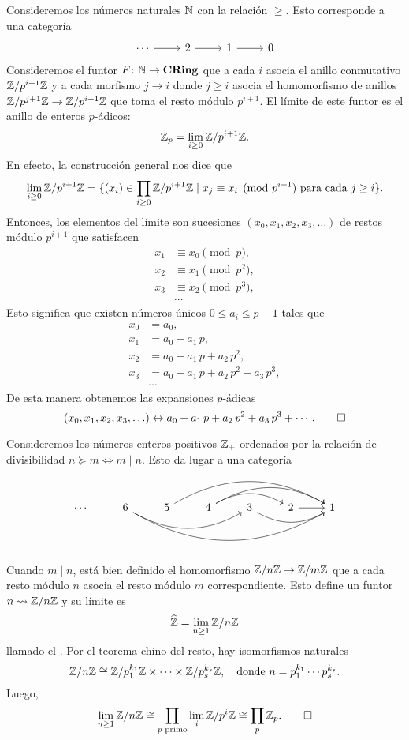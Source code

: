 \documentclass{article}
\numberwithin{equation}{section}
\theoremstyle{definition}
\begin{document}
\begin{ejemplo}
  Consideremos los números naturales $\mathbb{N}$ con la relación $\ge$. Esto
  corresponde a una categoría
  $$\begin{tikzcd}
    \cdots\ar{r} & 2\ar{r} & 1\ar{r} & 0
  \end{tikzcd}$$
  Consideremos el funtor $F\colon \mathbb{N}\to \text{\bf CRing}$ que a cada $i$ asocia el
  anillo conmutativo $\mathbb{Z}/p^{i+1}\mathbb{Z}$ y a cada morfismo $j\to i$ donde $j \ge i$
  asocia el homomorfismo de anillos $\mathbb{Z}/p^{j+1}\mathbb{Z} \to \mathbb{Z}/p^{i+1}\mathbb{Z}$ que toma
  el resto módulo $p^{i+1}$. El límite de este funtor es el anillo de enteros
  $p$-ádicos:
  $$\mathbb{Z}_p = \lim_{i\ge 0} \mathbb{Z}/p^{i+1}\mathbb{Z}.$$
  En efecto, la construcción general nos dice que
  \[ \lim_{i\ge 0} \mathbb{Z}/p^{i+1}\mathbb{Z} =
     \{ (x_i) \in \prod_{i\ge 0} \mathbb{Z}/p^{i+1}\mathbb{Z} \mid
            x_j \equiv x_i \pmod{p^{i+1}} \text{ para cada }j\ge i \}. \]
  Entonces, los elementos del límite son sucesiones
  $(x_0,x_1,x_2,x_3,\ldots)$ de restos módulo $p^{i+1}$ que satisfacen
  \begin{align*}
    x_1 & \equiv x_0 \pmod{p},\\
    x_2 & \equiv x_1 \pmod{p^2},\\
    x_3 & \equiv x_2 \pmod{p^3},\\
        & \cdots
  \end{align*}
  Esto significa que existen números únicos $0\le a_i\le p-1$ tales que
  \begin{align*}
    x_0 & = a_0,\\
    x_1 & = a_0 + a_1\,p,\\
    x_2 & = a_0 + a_1\,p + a_2\,p^2,\\
    x_3 & = a_0 + a_1\,p + a_2\,p^2 + a_3\,p^3,\\
        & \cdots
  \end{align*}
  De esta manera obtenemos las expansiones $p$-ádicas
  \[ (x_0,x_1,x_2,x_3,\ldots) \leftrightarrow
     a_0 + a_1\,p + a_2\,p^2 + a_3\,p^3 + \cdots. \qedhere \]
\end{ejemplo}

\begin{ejemplo}
  Consideremos los números enteros positivos $\mathbb{Z}_+$ ordenados por la relación
  de divisibilidad $n \succeq m \iff m \mid n$. Esto da lugar a una categoría
  \[ \begin{tikzcd}\cdots & 6\ar[bend right]{rrr}\ar[bend right]{rrrrr} & 5\ar[bend left]{rrrr} & 4\ar[bend left]{rr}\ar[bend left]{rrr} & 3\ar[bend right]{rr} & 2\ar{r} & 1 \end{tikzcd} \]

  Cuando $m\mid n$, está bien definido el homomorfismo $\mathbb{Z}/n\mathbb{Z}\to \mathbb{Z}/m\mathbb{Z}$
  que a cada resto módulo $n$ asocia el resto módulo $m$ correspondiente. Esto
  define un funtor $n \rightsquigarrow \mathbb{Z}/n\mathbb{Z}$ y su límite es
  $$\widehat{\mathbb{Z}} = \lim_{n\ge 1} \mathbb{Z}/n\mathbb{Z}$$
  llamado el . Por el teorema chino del resto, hay isomorfismos naturales
  \[ \mathbb{Z}/n\mathbb{Z} \cong \mathbb{Z}/p_1^{k_1}\mathbb{Z}\times\cdots\times  \mathbb{Z}/p_s^{k_s}\mathbb{Z}, \quad
     \text{donde }n = p_1^{k_1}\cdots p_s^{k_s}. \]
  Luego,
  \[ \lim_{n\ge 1} \mathbb{Z}/n\mathbb{Z} \cong
     \prod_{p\text{ primo}} \lim_i \mathbb{Z}/p^i\mathbb{Z} \cong
     \prod_p \mathbb{Z}_p. \qedhere \]
\end{ejemplo}
  
\end{document}

